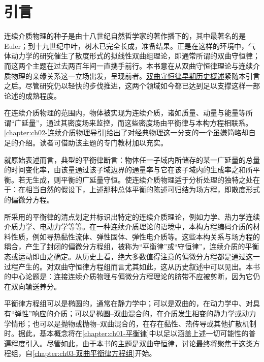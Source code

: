 \documentclass[../../main.tex]{subfiles}
\begin{document}

\chapter*{引言}
\label{chapter:front-introduction}

连续介质物理的种子是由十八世纪自然哲学家的著作播下的，其中最著名的是 Euler；到十九世纪中叶，树木已完全长成，准备结果。正是在这样的环境中，气体动力学的研究催生了散度形式的拟线性双曲组理论，即通常所谓的双曲守恒律；而这两个主题在过去两百年间一直携手前行。本书意在从双曲守恒律理论与连续介质物理的亲缘关系这一立场出发，呈现前者。\hyperref[chapter:front-history]{双曲守恒律早期历史概述}紧随本引言之后。尽管研究仍以轻快的步伐推进，这两个领域如今都已达到足以支撑这样一部论述的成熟程度。

在连续介质物理的范围内，物体被实现为连续介质，诸如质量、动量与能量等所谓“广延量”，通过其密度场来监控，而这些密度场由平衡律与本构方程相联系。\cref{chapter:ch02-连续介质物理导引}给出了对经典物理这一分支的一个虽嫌简略却自足的介绍。读者可借助该主题的专门教材加以充实。

就原始表述而言，典型的平衡律断言：物体任一子域内所储存的某一广延量的总量的时间变化率，由该量通过该子域边界的通量率与它在该子域内的生成率之和所平衡。若无生成，则平衡的广延量守恒。使连续介质物理适于分析处理的独特之处在于：在相当自然的假设下，上述那种总体平衡的陈述可归结为场方程，即散度形式的偏微分方程。

所采用的平衡律的清点划定并标识出特定的连续介质理论，例如力学、热力学连续介质力学、电动力学等等。在一种连续介质理论的语境中，本构方程编码介质的材料性质，例如导热黏性流体、弹性固体、弹性电介质等。这些本构关系与场方程的耦合，产生了封闭的偏微分方程组，被称为“平衡律”或“守恒律”，连续介质的平衡态或运动即由之确定。从历史上看，绝大多数值得注意的偏微分方程都是通过这一过程产生的。对双曲守恒律方程组而言尤其如此，这从历史叙述中可以见出。本书的中心论题是：连接连续介质物理与偏微分方程理论的脐带不应被剪断，因为它仍在双向输送养分。

平衡律方程组可以是椭圆的，通常在静力学中；可以是双曲的，在动力学中、对具有“弹性”响应的介质；可以是椭圆--双曲混合的，在介质发生相变的静力学或动力学情形；也可以是抛物或抛物--双曲混合的，在存在黏性、热传导或其他扩散机制时。据此，基本概念将在\cref{chapter:ch01-平衡律}中以足以涵盖上述一切可能性的普遍程度引入。尽管如此，由于本书的主题是双曲守恒律，讨论最终将聚焦于这类方程组，自\cref{chapter:ch03-双曲平衡律方程组}开始。
\end{document}
